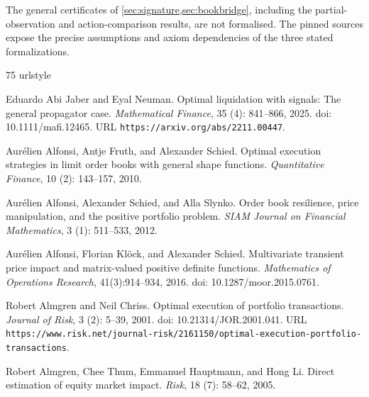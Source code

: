 \documentclass[11pt]{article}
\numberwithin{equation}{section}
\theoremstyle{definition}
\theoremstyle{remark}
\theoremstyle{definition}
\begin{document}
The general certificates of \cref{sec:signature,sec:bookbridge}, including
the partial-observation and action-comparison results, are not formalised.
The pinned sources expose the precise assumptions and axiom dependencies
of the three stated formalizations.

\clearpage
\setlength{\bibsep}{2.5pt plus 0.5pt minus 0.5pt}
\begin{thebibliography}{75}
\providecommand{\natexlab}[1]{#1}
\providecommand{\url}[1]{\texttt{#1}}
\expandafter\ifx\csname urlstyle\endcsname\relax
  \providecommand{\doi}[1]{doi: #1}\else
  \providecommand{\doi}{doi: \begingroup \urlstyle{rm}\Url}\fi

Eduardo {Abi Jaber} and Eyal Neuman.
\newblock Optimal liquidation with signals: The general propagator case.
\newblock \emph{Mathematical Finance}, 35 (4): 841--866,
  2025.
\newblock \doi{10.1111/mafi.12465}.
\newblock URL \url{https://arxiv.org/abs/2211.00447}.


Aur{\'e}lien Alfonsi, Antje Fruth, and Alexander Schied.
\newblock Optimal execution strategies in limit order books with general shape
  functions.
\newblock \emph{Quantitative Finance}, 10 (2): 143--157,
  2010.

Aur{\'e}lien Alfonsi, Alexander Schied, and Alla Slynko.
\newblock Order book resilience, price manipulation, and the positive portfolio
  problem.
\newblock \emph{SIAM Journal on Financial Mathematics}, 3
  (1): 511--533, 2012.

Aur{\'e}lien Alfonsi, Florian Kl{\"o}ck, and Alexander Schied.
\newblock Multivariate transient price impact and matrix-valued positive definite
functions.
\newblock \emph{Mathematics of Operations Research}, 41(3):914--934, 2016.
\newblock \doi{10.1287/moor.2015.0761}.

Robert Almgren and Neil Chriss.
\newblock Optimal execution of portfolio transactions.
\newblock \emph{Journal of Risk}, 3 (2): 5--39, 2001.
\newblock \doi{10.21314/JOR.2001.041}.
\newblock URL
  \url{https://www.risk.net/journal-risk/2161150/optimal-execution-portfolio-transactions}.

Robert Almgren, Chee Thum, Emmanuel Hauptmann, and Hong Li.
\newblock Direct estimation of equity market impact.
\newblock \emph{Risk}, 18 (7): 58--62, 2005.


\end{thebibliography}
\end{document}
